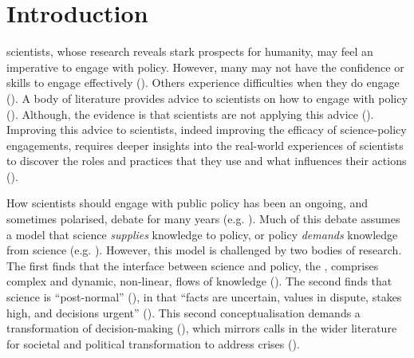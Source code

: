 \chapter{Introduction}\label{ch:intro}

\CAN{} scientists, whose research reveals stark prospects for humanity, may feel an imperative to engage with policy. However, many may not have the confidence or skills to engage effectively (\cite{BednarekSHG2015,KennyRHTB2017,KEU2021perceptions}). Others experience difficulties when they do engage (\cite{Stirling2010,Gerber2023,Hicks2024}). A body of literature provides advice to scientists on how to engage with policy (\cite{OliverC2019}). Although, the evidence is that scientists are not applying this advice (\cite{CairneyTS2023}). Improving this advice to scientists, indeed improving the efficacy of science-policy engagements, requires deeper insights into the real-world experiences of scientists to discover the roles and practices that they use and what influences their actions  (\cite{KennyRHTB2017}). 

How scientists should engage with public policy has been an ongoing, and sometimes polarised, debate for many years (e.g. \cite{Lackey2004,Nau2009,Stirling2010,Milman2013,Tyler2013,Oreskes2020,GluckmanBK2021,GregoryBW2024,Bisbal2024,Hicks2024}). Much of this debate assumes a model that science \emph{supplies} knowledge to policy, or policy \emph{demands} knowledge from science (e.g. \cite{McNie2007,KennyRHTB2017,Castree2019}). However, this model is challenged by two bodies of research. The first finds that the interface between science and policy, the \SPI, comprises complex and dynamic, non-linear, flows of knowledge (\cite{StrassheimK2014,BoswellS2017}). The second finds that \CAN{} science is ``post-normal'' (\cite{FuntowiczR1993}), in that ``facts are uncertain, values in dispute, stakes high, and decisions urgent'' (\cite[p649]{Ravetz1999}). This second conceptualisation demands a transformation of \CAN{} decision-making (\cite{FuntowiczR1993,Ravetz1999,Jasanoff2003,Hewitt2024}), which mirrors calls in the wider literature for societal and political transformation to address \CAN{} crises (\cite{DiazEtAl2019,LaybournTS2023,VerfuerthDCWP2023,GuptaEtAl2024}).

